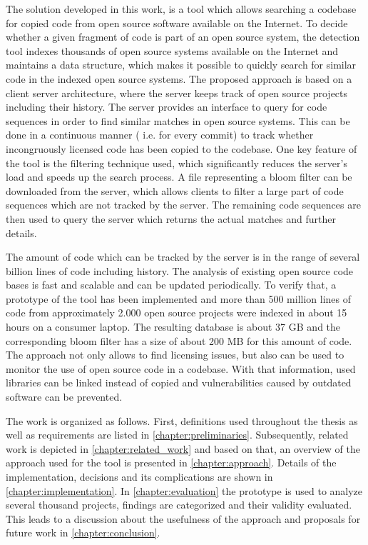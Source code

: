 The solution developed in this work, is a tool which allows searching a codebase for copied code from open source software available on the Internet.
To decide whether a given fragment of code is part of an open source system, the detection tool indexes thousands of open source systems available on the Internet and maintains a data structure, which makes it possible to quickly search for similar code in the indexed open source systems.
The proposed approach is based on a client server architecture, where the server keeps track of open source projects including their history.
The server provides an interface to query for code sequences in order to find similar matches in open source systems.
This can be done in a continuous manner ( i.e. for every commit) to track whether incongruously licensed code has been copied to the codebase.
One key feature of the tool is the filtering technique used, which significantly reduces the server's load and speeds up the search process.
A file representing a bloom filter can be downloaded from the server, which allows clients to filter a large part of code sequences which are not tracked by the server.
The remaining code sequences are then used to query the server which returns the actual matches and further details.

The amount of code which can be tracked by the server is in the range of several billion lines of code including history.
The analysis of existing open source code bases is fast and scalable and can be updated periodically.
To verify that, a prototype of the tool has been implemented and more than 500 million lines of code from approximately 2.000 open source projects were indexed in about 15 hours on a consumer laptop.
The resulting database is about 37 GB and the corresponding bloom filter has a size of about 200 MB for this amount of code.
The approach not only allows to find licensing issues, but also can be used to monitor the use of open source code in a codebase.
With that information, used libraries can be linked instead of copied and vulnerabilities caused by outdated software can be prevented.

The work is organized as follows.
First, definitions used throughout the thesis as well as requirements are listed in \autoref{chapter:preliminaries}.
Subsequently, related work is depicted in \autoref{chapter:related_work} and based on that, an overview of the approach used for the tool is presented in \autoref{chapter:approach}.
Details of the implementation, decisions and its complications are shown in \autoref{chapter:implementation}.
In \autoref{chapter:evaluation} the prototype is used to analyze several thousand projects, findings are categorized and their validity evaluated.
This leads to a discussion about the usefulness of the approach and proposals for future work in \autoref{chapter:conclusion}.